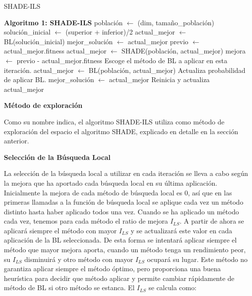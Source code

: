 \begin{algorithm}
\caption{SHADE-ILS}
\begin{algorithmic}[1]
\STATE \textbf{Algoritmo 1: SHADE-ILS}
\STATE población $\leftarrow$ (dim, tamaño\_población)
\STATE solución\_inicial $\leftarrow$ (superior + inferior)/2
\STATE actual\_mejor $\leftarrow$ BL(solución\_inicial)
\STATE mejor\_solución $\leftarrow$ actual\_mejor
    \STATE previo $\leftarrow$ actual\_mejor.fitness
    \STATE actual\_mejor $\leftarrow$ SHADE(población, actual\_mejor)
    \STATE mejora $\leftarrow$ previo - actual\_mejor.fitness
    \STATE Escoge el método de BL a aplicar en esta iteración.
    \STATE actual\_mejor $\leftarrow$ BL(población, actual\_mejor)
    \STATE Actualiza probabilidad de aplicar BL.
        \STATE mejor\_solución $\leftarrow$ actual\_mejor
    \ENDIF
        \STATE Reinicia y actualiza actual\_mejor
    \ENDIF
\ENDWHILE
\end{algorithmic}
\end{algorithm}

\vspace{10px}

\noindent\textbf{Método de exploración}

Como su nombre indica, el algoritmo SHADE-ILS utiliza como método de exploración del espacio el algoritmo SHADE, explicado en detalle en la sección anterior.

\vspace{10px}

\noindent\textbf{Selección de la Búsqueda Local}

La selección de la búsqueda local a utilizar en cada iteración se lleva a cabo según la mejora que ha aportado cada búsqueda local en su última aplicación. Inicialmente la mejora de cada método de búsqueda local es $0$, así que en las primeras llamadas a la función de búsqueda local se aplique cada vez un método distinto hasta haber aplicado todos una vez. Cuando se ha aplicado un método cada vez, tenemos para cada método el ratio de mejora \( I_{LS} \). A partir de ahora se aplicará siempre el método con mayor \( I_{LS} \) y se actualizará este valor en cada aplicación de la BL seleccionada. De esta forma se intentará aplicar siempre el método que mayor mejora aporta, cuando un método tenga un rendimiento peor, su \( I_{LS} \) disminuirá y otro método con mayor \( I_{LS} \) ocupará su lugar. Este método no garantiza aplicar siempre el método óptimo, pero proporciona una buena heurística para decidir que método aplicar y permite cambiar rápidamente de método de BL si otro método se estanca. El \( I_{LS} \) se calcula como:

